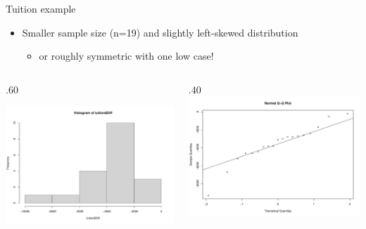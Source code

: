 \documentclass[
  10pt,
  ignorenonframetext,
]{beamer}
\newenvironment{Shaded}{\begin{snugshade}}{\end{snugshade}}
\newcommand{\FunctionTok}[1]{\textcolor[rgb]{0.00,0.00,0.00}{#1}}
\newcommand{\NormalTok}[1]{#1}
\newcommand{\SpecialCharTok}[1]{\textcolor[rgb]{0.00,0.00,0.00}{#1}}
\providecommand{\tightlist}{%
  \setlength{\itemsep}{0pt}\setlength{\parskip}{0pt}}
\def\begincols{\begin{columns}}
\def\begincol{\begin{column}}
\def\endcol{\end{column}}
\def\endcols{\end{columns}}
\let\oldShaded\Shaded
\let\endoldShaded\endShaded
\renewenvironment{Shaded}{\tiny\oldShaded}{\endoldShaded}
\begin{document}
\begin{frame}[fragile]{Tuition example}
\protect\hypertarget{tuition-example-1}{}
\begin{itemize}
\tightlist
\item
  Smaller sample size (n=19) and slightly left-skewed distribution

  \begin{itemize}
  \tightlist
  \item
    or roughly symmetric with one low case!
  \end{itemize}
\end{itemize}

\begin{Shaded}
\end{Shaded}

\begincols
  \begincol{.60\textwidth}

\includegraphics{Day1_files/figure-beamer/unnamed-chunk-15-1.pdf}
\endcol \begincol{.40\textwidth}
\includegraphics{Day1_files/figure-beamer/unnamed-chunk-16-1.pdf}
\endcol \endcols
\end{frame}
\end{document}
